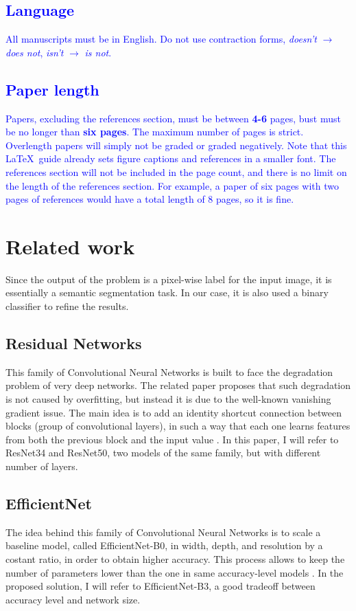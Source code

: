 \documentclass[10pt,twocolumn,letterpaper]{article}
\begin{document}
   \textcolor{blue}{
   \subsection{Language}
      All manuscripts must be in English. Do not use contraction forms, \eg \emph{doesn't} $\xrightarrow{}$ \emph{does not}, \emph{isn't} $\xrightarrow{}$ \emph{is not}. }

   \textcolor{blue}{
   \subsection{Paper length}
      Papers, excluding the references section, must be between \textbf{4-6} pages, bust must be no longer than \textbf{six pages}. The maximum number of pages is strict. Overlength papers will simply not be graded or graded negatively. Note that this \LaTeX\ guide already sets figure captions and references in a smaller font.
      The references section will not be included in the page count, and there is no limit on the length of the references section. For example, a paper of six pages with two pages of references would have a total length of 8 pages, so it is fine.}



\section{Related work}
   Since the output of the problem is a pixel-wise label for the input image, it is essentially a semantic segmentation task. In our case, it is also used a binary classifier to refine the results.
   \subsection{Residual Networks} 
      This family of Convolutional Neural Networks is built to face the degradation problem of very deep networks. The related paper proposes that such degradation is not caused by overfitting, but instead it is due to the well-known vanishing gradient issue. The main idea is to add an identity shortcut connection between blocks (group of convolutional layers), in such a way that each one learns features from both the previous block and the input value \cite{resnet}.
      In this paper, I will refer to ResNet34 and ResNet50, two models of the same family, but with different number of layers.
   \subsection{EfficientNet}
      The idea behind this family of Convolutional Neural Networks is to scale a baseline model, called EfficientNet-B0, in width, depth, and resolution by a costant ratio, in order to obtain higher accuracy. This process allows to keep the number of parameters lower than the one in same accuracy-level models \cite{efficientnet}. In the proposed solution, I will refer to EfficientNet-B3, a good tradeoff between accuracy level and network size.
\end{document}

